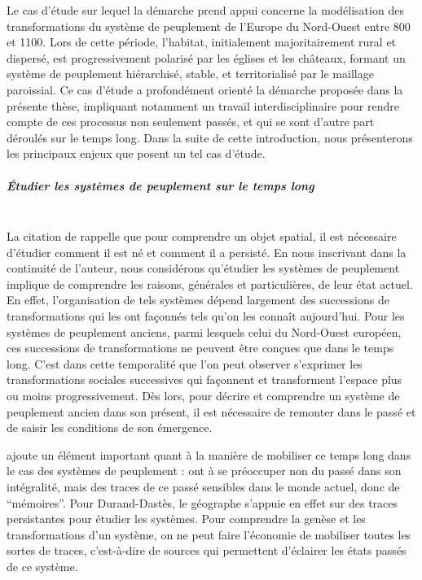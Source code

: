Le cas d'étude sur lequel la démarche prend appui concerne la modélisation des transformations du système de peuplement de l'Europe du Nord-Ouest entre 800 et 1100.
Lors de cette période, l'habitat, initialement majoritairement rural et dispersé, est progressivement polarisé par les églises et les châteaux, formant un système de peuplement hiérarchisé, stable, et territorialisé par le maillage paroissial.
Ce cas d'étude a profondément orienté la démarche proposée dans la présente thèse, impliquant notamment un travail interdisciplinaire pour rendre compte de ces processus non seulement passés, et qui se sont d'autre part déroulés sur le temps long.
Dans la suite de cette introduction, nous présenterons les principaux enjeux que posent un tel cas d'étude.


\subparagraph{Étudier les systèmes de peuplement sur le temps long}~\\
La citation de \textcite{durand-dastes_jamais_1999} rappelle que pour comprendre un \og objet spatial\fg{}, il est nécessaire d'étudier \og comment il est né et comment il a persisté\fg{}.
En nous inscrivant dans la continuité de l'auteur, nous considérons qu'étudier les systèmes de peuplement implique de comprendre les raisons, générales et particulières, de leur état actuel.
En effet, l'organisation de tels systèmes dépend largement des successions de transformations qui les ont façonnés tels qu'on les connaît aujourd'hui.
Pour les systèmes de peuplement anciens, parmi lesquels celui du Nord-Ouest européen, ces successions de transformations ne peuvent être conçues que dans le temps long.
C'est dans cette temporalité que l'on peut observer s'exprimer les transformations sociales successives qui façonnent et transforment l'espace plus ou moins progressivement.
Dès lors, pour décrire et comprendre un système de peuplement ancien dans son présent, il est nécessaire de remonter dans le passé et de saisir les conditions de son émergence.

\textcite{durand-dastes_jamais_1999} ajoute un élément important quant à la manière de mobiliser ce temps long dans le cas des systèmes de peuplement : 	 ont à se préoccuper non du passé dans son intégralité, mais des traces de ce passé sensibles dans le monde actuel, donc de “mémoires”\fg{}.
Pour Durand-Dastès, le géographe s'appuie en effet sur des \og traces\fg{} persistantes pour étudier les systèmes.
Pour comprendre la genèse et les transformations d'un système, on ne peut faire l'économie de mobiliser toutes les sortes de traces, c'est-à-dire de sources qui permettent d'éclairer les états passés de ce système.


